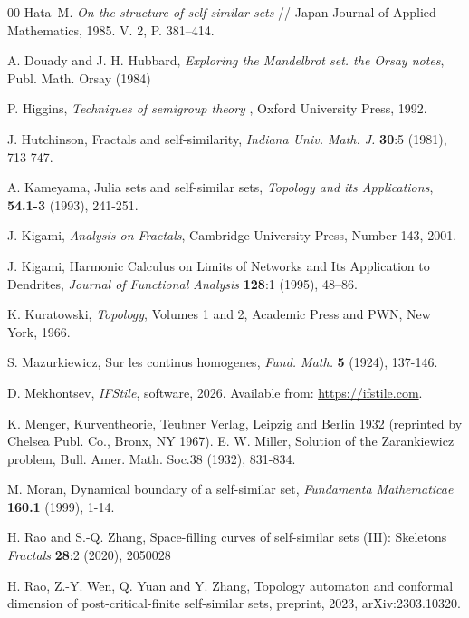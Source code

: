 \documentclass[11pt,reqno]{amsart}
\begin{document}
\begin{thebibliography}{00}
{Hata~M.}
{\it On the structure of self-similar sets} //
{Japan Journal of Applied Mathematics, 1985.  V. 2, P. 381--414.}

  A. Douady and J. H. Hubbard, \textit{Exploring the Mandelbrot set. the Orsay notes}, Publ. Math. Orsay (1984)

 P. Higgins,
 \emph{Techniques of semigroup theory },
 Oxford University Press, 1992.

 J. Hutchinson,
 {Fractals and self-similarity},
 \emph{Indiana Univ. Math. J.} \textbf{30}:5 (1981),  713-747.



 A. Kameyama,
{Julia sets and self-similar sets},
\emph{Topology and its Applications},
\textbf{54.1-3} (1993), 241-251.

 J. Kigami,
 \emph{Analysis on Fractals},
 Cambridge University Press, Number 143, 2001.

 J. Kigami,
 {Harmonic Calculus on Limits of Networks and Its Application to Dendrites},
 \emph{Journal of Functional Analysis} \textbf{128}:1 (1995), 48--86.

 K. Kuratowski,
 \emph{Topology},  
 Volumes 1 and 2,  Academic Press and PWN, New York,  1966. 

S. Mazurkiewicz, 
{Sur les continus homogenes}, 
\emph{Fund. Math.} \textbf{5} (1924), 137-146.


 D. Mekhontsev,
 \emph{IFStile}, software,
 2026. Available from: \url{https://ifstile.com}.


 K. Menger, Kurventheorie, Teubner Verlag, Leipzig and Berlin 1932 (reprinted by Chelsea Publ.
Co., Bronx, NY 1967).
 E. W. Miller, Solution of the Zarankiewicz problem, Bull. Amer. Math. Soc.38 (1932), 831-834.

 M. Moran,
 {Dynamical boundary of a self-similar set},
 \emph{Fundamenta Mathematicae} \textbf{160.1} (1999), 1-14.

 H. Rao and S.-Q. Zhang,
 {Space-filling curves of self-similar sets (III): Skeletons}
 \emph{Fractals} \textbf{28}:2 (2020), 2050028

 H. Rao, Z.-Y. Wen, Q. Yuan and Y. Zhang,
 Topology automaton and conformal dimension of post-critical-finite self-similar sets,
 preprint, 2023, arXiv:2303.10320.




\end{thebibliography}
\end{document}
